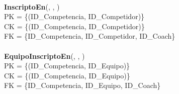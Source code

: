\\
\textbf{InscriptoEn}(, , )\\
PK = \{(ID\_Competencia, ID\_Competidor)\}\\
CK = \{(ID\_Competencia, ID\_Competidor)\}\\
FK = \{ID\_Competencia, ID\_Competidor, ID\_Coach\}\\
\\
\textbf{EquipoInscriptoEn}(, , )\\
PK = \{(ID\_Competencia, ID\_Equipo)\}\\
CK = \{(ID\_Competencia, ID\_Equipo)\}\\
FK = \{ID\_Competencia, ID\_Equipo, ID\_Coach\}\\
\\